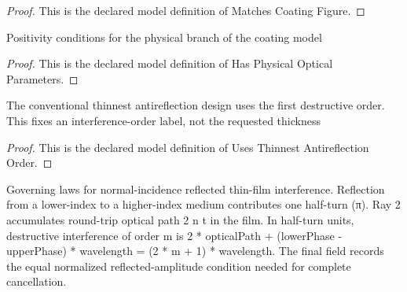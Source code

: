 \begin{proof}
  This is the declared model definition of Matches Coating Figure.
\end{proof}
\begin{definition}
  \label{def:physics:phyx-mini-0128:phyxminiproblems-problemphyxmini0128-hasphysicalopticalparameters}
  Positivity conditions for the physical branch of the coating model
\end{definition}
\begin{proof}
  This is the declared model definition of Has Physical Optical Parameters.
\end{proof}
\begin{definition}
  \label{def:physics:phyx-mini-0128:phyxminiproblems-problemphyxmini0128-usesthinnestantireflectionorder}
  The conventional thinnest antireflection design uses the first destructive order. This fixes an interference-order label, not the requested thickness
\end{definition}
\begin{proof}
  This is the declared model definition of Uses Thinnest Antireflection Order.
\end{proof}
\begin{definition}
  \label{def:physics:phyx-mini-0128:phyxminiproblems-problemphyxmini0128-satisfiesantireflectionthinfilmlaws}
  Governing laws for normal-incidence reflected thin-film interference. Reflection from a lower-index to a higher-index medium contributes one half-turn (π). Ray 2 accumulates round-trip optical path 2 n t in the film. In half-turn units, destructive interference of order m is 2 * opticalPath + (lowerPhase - upperPhase) * wavelength = (2 * m + 1) * wavelength. The final field records the equal normalized reflected-amplitude condition needed for complete cancellation.
\end{definition}
